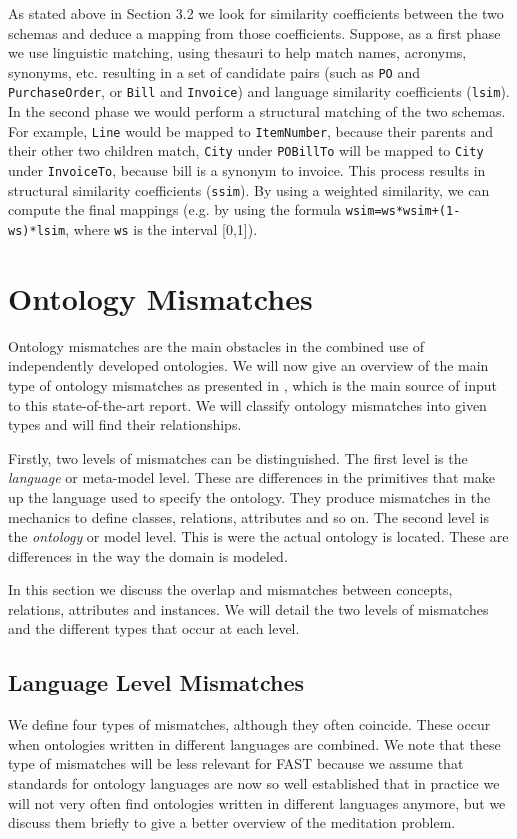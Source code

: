 \documentclass{fast_latex}
\begin{document}
As stated above in Section 3.2 we look for similarity coefficients
between the two schemas and deduce a mapping from those coefficients.
Suppose, as a first phase we use linguistic matching, using thesauri to
help match names, acronyms, synonyms, etc. resulting in a set of
candidate pairs (such as \texttt{PO} and
\texttt{PurchaseOrder}, or \texttt{Bill} and
\texttt{Invoice}) and language similarity coefficients
(\texttt{lsim}). In the second phase we would perform a
structural matching of the two schemas. For example,
\texttt{Line} would be mapped to
\texttt{ItemNumber}, because their parents and their other
two children match, \texttt{City} under
\texttt{POBillTo} will be mapped to
\texttt{City} under \texttt{InvoiceTo},
because bill is a synonym to invoice. This process results in
structural similarity coefficients (\texttt{ssim}). By
using a weighted similarity, we can compute the final mappings (e.g. by
using the formula \texttt{wsim=ws*wsim+(1-ws)*lsim}, where
\texttt{ws} is the interval [0,1]). 


\section{Ontology Mismatches}
\label{sec:ontologymismatches}
Ontology mismatches are the main obstacles in the combined use of
independently developed ontologies. We will now give an overview of the
main type of ontology mismatches as presented in \cite{klein2001combiningOntologies}, which
is the main source of input to this state-of-the-art report. We will
classify ontology mismatches into given types and will find their
relationships. 

Firstly, two levels of mismatches can be distinguished. The first level
is the \textit{language} or meta-model level. These are differences in
the primitives that make up the language used to specify the ontology.
They produce mismatches in the mechanics to define classes, relations,
attributes and so on. The second level is the \textit{ontology} or
model level. This is were the actual ontology is located. These are
differences in the way the domain is modeled. 

In this section we discuss the overlap and mismatches between concepts,
relations, attributes and instances. We will detail the two levels of
mismatches and the different types that occur at each level. 

\subsection{Language Level Mismatches}
\label{subsec:ontologymismatches_languagelevel}
We define four types of mismatches, although they often coincide. These
occur when ontologies written in different languages are combined. We
note that these type of mismatches will be less relevant for FAST
because we assume that standards for ontology languages are now so well
established that in practice we will not very often find ontologies
written in different languages anymore, but we discuss them briefly to
give a better overview of the meditation problem. 
\end{document}
